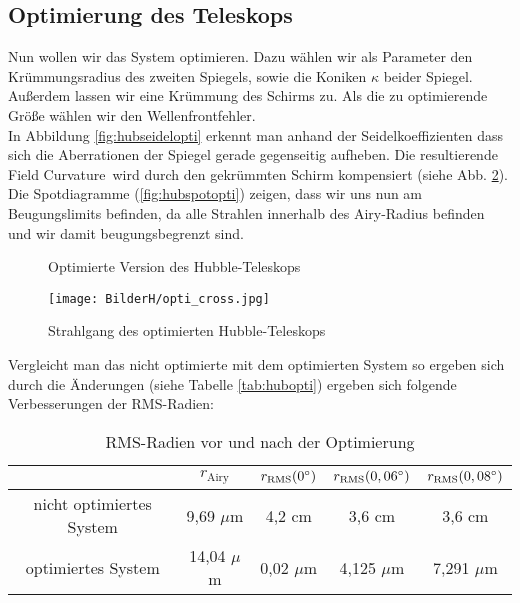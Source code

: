 \documentclass[twoside,colorback,accentcolor=tud4c,11pt]{tudreport}
\begin{document}
\subsection{Optimierung des Teleskops}
Nun wollen wir das System optimieren. Dazu wählen wir als Parameter den Krümmungsradius des zweiten Spiegels, sowie die Koniken $ \kappa $ beider Spiegel. Außerdem lassen wir eine Krümmung des Schirms zu. Als die zu optimierende Größe wählen wir den Wellenfrontfehler. \\
In Abbildung \ref{fig:hubseidelopti} erkennt man anhand der Seidelkoeffizienten dass sich die Aberrationen der Spiegel gerade gegenseitig aufheben. Die resultierende \glqq Field Curvature\grqq\, wird durch den gekrümmten Schirm kompensiert (siehe Abb. \ref{fig:hubcrossopti}). Die Spotdiagramme (\ref{fig:hubspotopti}) zeigen, dass wir uns nun am Beugungslimits befinden, da alle Strahlen innerhalb des Airy-Radius befinden und wir damit beugungsbegrenzt sind.
\begin{figure}[H]
\centering
  \quad
  \quad   
  \caption{Optimierte Version des Hubble-Teleskops}
  \label{fig:hubopti}
  
\end{figure}
\begin{figure}[H]
\centering
   	\begin{minipage}[b]{\textwidth}
   	\texttt{[image: BilderH/opti\_cross.jpg]}
   	\caption{Strahlgang des optimierten Hubble-Teleskops}
  	\label{fig:hubcrossopti}
   	\end{minipage}
\end{figure}
Vergleicht man das nicht optimierte mit dem optimierten System so ergeben sich durch die Änderungen (siehe Tabelle \ref{tab:hubopti}) ergeben sich folgende Verbesserungen der RMS-Radien:

\begin{table}[H]
\centering
\begin{tabular}{|c|c|c|c|c|}
\hline 
 & $r_{\text{Airy}}$ & $r_{\text{RMS}}(0\degree)$ & $r_{\text{RMS}}(0,06\degree)$ & $r_{\text{RMS}}(0,08\degree)$ \\ 
\hline 
nicht optimiertes System & 9,69 $\mu$m & 4,2 cm & 3,6 cm & 3,6 cm \\ 
\hline 
optimiertes System & 14,04 $\mu$m & 0,02 $\mu$m & 4,125 $\mu$m & 7,291 $\mu$m \\ 
\hline 
\end{tabular} 
\caption{RMS-Radien vor und nach der Optimierung}
\end{table}
\end{document}
